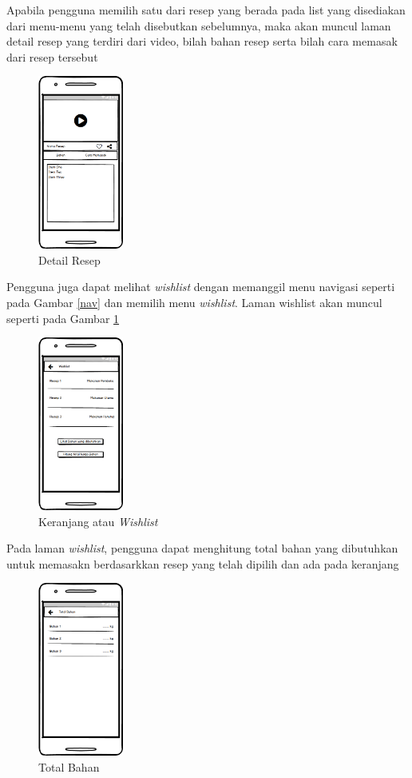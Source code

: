 		Apabila pengguna memilih satu dari resep yang berada pada list yang disediakan dari menu-menu yang telah disebutkan sebelumnya, maka akan muncul laman detail resep yang terdiri dari video, bilah bahan resep serta bilah cara memasak dari resep tersebut
		\begin{figure}[H]
			\centering
			\includegraphics[width=0.25\textwidth]{gambar/wireframe/Resep}
			\caption{Detail Resep}
		\end{figure}
		Pengguna juga dapat melihat \textit{wishlist} dengan memanggil menu navigasi seperti pada Gambar \ref{nav} dan memilih menu \textit{wishlist}. Laman wishlist akan muncul seperti pada Gambar \ref{wire-wish}
		\begin{figure}[H]
			\centering
			\includegraphics[width=0.25\textwidth]{gambar/wireframe/Wishlist}
			\caption{Keranjang atau \textit{Wishlist}}
			\label{wire-wish}
		\end{figure}
		Pada laman \textit{wishlist}, pengguna dapat menghitung total bahan yang dibutuhkan untuk memasakn berdasarkkan resep yang telah dipilih dan ada pada keranjang
		\begin{figure}[H]
			\centering
			\includegraphics[width=0.25\textwidth]{gambar/wireframe/TotalBahan}
			\caption{Total Bahan}
		\end{figure}
